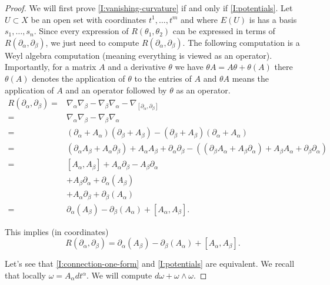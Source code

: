 \documentclass[12pt]{book}
\numberwithin{equation}{section}
\theoremstyle{definition}
\theoremstyle{remark}
\begin{document}
\begin{proof}
	We will first prove \eqref{I:vanishing-curvature} if and only if \eqref{I:potentials}.
	Let $U\subset X$ be an open set with coordinates $t^{1},\ldots,t^m$ and where $E(U)$ is has a basis $s_1,\ldots,s_n$. 
	Since every expression of $R(\theta_1,\theta_2)$ can be expressed in terms of $R(\partial_{\alpha},\partial_{\beta})$, we just need to compute $R(\partial_{\alpha},\partial_{\beta})$.
	The following computation is a Weyl algebra computation (meaning everything is viewed as an operator).
	Importantly, for a matrix $A$ and a derivative $\theta$ we have $\theta A = A\theta + \theta(A)$ there $\theta(A)$ denotes the application of $\theta$ to the entries of $A$ and $\theta A$ means the application of $A$ and an operator followed by $\theta$ as an operator.
	\begin{align*}
	R(\partial_{\alpha},\partial_{\beta}) =& \nabla_{\alpha}\nabla_{\beta} - \nabla_{\beta}\nabla_{\alpha} - \nabla_{[\partial_{\alpha},\partial_{\beta}]} \\
	=&\nabla_{\alpha}\nabla_{\beta} - \nabla_{\beta}\nabla_{\alpha} \\
	=&(\partial_{\alpha}+A_{\alpha})(\partial_{\beta} + A_{\beta}) - (\partial_{\beta}+A_{\beta})(\partial_{\alpha} + A_{\alpha}) \\
	=& (\partial_{\alpha} A_{\beta} +A_{\alpha}\partial_{\beta}) + A_{\alpha}A_{\beta} + \partial_{\alpha} \partial_{\beta}- \left( (\partial_{\beta} A_{\alpha} +A_{\beta}\partial_{\alpha}) + A_{\beta}A_{\alpha} + \partial_{\beta} \partial_{\alpha} \right) \\
	=& [A_{\alpha},A_{\beta}] + A_{\alpha} \partial_{\beta}-A_{\beta}\partial_{\alpha} \\
	& + A_{\beta}\partial_{\alpha} + \partial_{\alpha}(A_{\beta}) \\
	& + A_{\alpha} \partial_{\beta} + \partial_{\beta}(A_{\alpha}) \\
	=& \partial_{\alpha}(A_{\beta}) - \partial_{\beta}(A_{\alpha}) + [A_{\alpha},A_{\beta}].
	\end{align*}

	This implies (in coordinates) 
	$$ R(\partial_{\alpha},\partial_{\beta})=\partial_{\alpha}(A_{\beta}) - \partial_{\beta}(A_{\alpha}) + [A_{\alpha},A_{\beta}].$$
	
	Let's see that \eqref{I:connection-one-form} and \eqref{I:potentials} are equivalent. 
	We recall that locally $\omega=A_{\alpha}dt^{\alpha}$. 
	We will compute $d\omega + \omega\wedge \omega$.
	

\end{proof}
\end{document}
